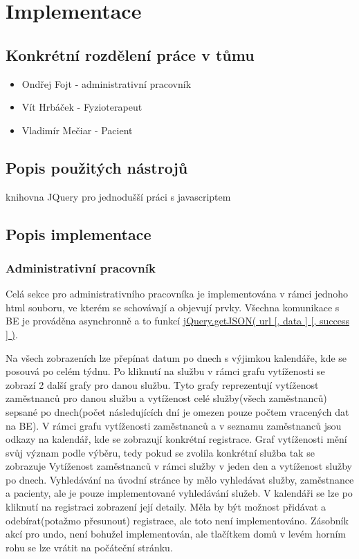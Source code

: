 \section{Implementace}

\subsection*{Konkrétní rozdělení práce v tůmu}
\begin{itemize}
    \item[] Ondřej Fojt     - administrativní pracovník
    \item[] Vít Hrbáček     - Fyzioterapeut
    \item[] Vladimír Mečiar - Pacient
\end{itemize}

\subsection*{Popis použitých nástrojů}
    knihovna JQuery pro jednodušší práci s javascriptem


\subsection*{Popis implementace}

\subsubsection*{Administrativní pracovník}

Celá sekce pro administrativního pracovníka je implementována v rámci jednoho html souboru, ve kterém se schovávají a objevují prvky.
Všechna komunikace s BE je prováděna asynchronně a to funkcí \hyperlink{https://api.jquery.com/jQuery.getJSON/}{jQuery.getJSON( url [, data ] [, success ] )}.

Na všech zobrazeních lze přepínat datum po dnech s výjimkou kalendáře, kde se posouvá po celém týdnu.
Po kliknutí na službu v rámci grafu vytíženosti se zobrazí 2 další grafy pro danou službu. Tyto grafy reprezentují vytíženost zaměstnanců pro danou službu a vytíženost celé služby(všech zaměstnanců) sepsané po dnech(počet následujících dní je omezen pouze počtem vracených dat na BE).
V rámci grafu vytíženosti zaměstnanců a v seznamu zaměstnanců jsou odkazy na kalendář, kde se zobrazují konkrétní registrace.
Graf vytíženosti mění svůj význam podle výběru, tedy pokud se zvolila konkrétní služba tak se zobrazuje Vytíženost zaměstnanců v rámci služby v jeden den a vytíženost služby po dnech.
Vyhledávání na úvodní stránce by mělo vyhledávat služby, zaměstnance a pacienty, ale je pouze implementované vyhledávání služeb.
V kalendáři se lze po kliknutí na registraci zobrazení její detaily.
Měla by být možnost přidávat a odebírat(potažmo přesunout) registrace, ale toto není implementováno.
Zásobník akcí pro undo, není bohužel implementován, ale tlačítkem domů v levém horním rohu se lze vrátit na počáteční stránku.

